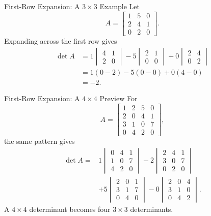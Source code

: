 \begin{frame}{First-Row Expansion: A $3\times3$ Example}
Let
\[
A=\begin{bmatrix}1&5&0\\2&4&1\\0&2&0\end{bmatrix}.
\]
Expanding across the first row gives
\begin{align*}
\det A
&=1\begin{vmatrix}4&1\\2&0\end{vmatrix}
-5\begin{vmatrix}2&1\\0&0\end{vmatrix}
+0\begin{vmatrix}2&4\\0&2\end{vmatrix}\\
&=1(0-2)-5(0-0)+0(4-0)\\
&=-2.
\end{align*}
\end{frame}

\begin{frame}{First-Row Expansion: A $4\times4$ Preview}
\small
For
\[
A=\begin{bmatrix}
1&2&5&0\\
2&0&4&1\\
3&1&0&7\\
0&4&2&0
\end{bmatrix},
\]
the same pattern gives
\[
\begin{aligned}
\det A
={}&1\begin{vmatrix}0&4&1\\1&0&7\\4&2&0\end{vmatrix}
-2\begin{vmatrix}2&4&1\\3&0&7\\0&2&0\end{vmatrix}\\
&+5\begin{vmatrix}2&0&1\\3&1&7\\0&4&0\end{vmatrix}
-0\begin{vmatrix}2&0&4\\3&1&0\\0&4&2\end{vmatrix}.
\end{aligned}
\]
\pause
A $4\times4$ determinant becomes four $3\times3$ determinants.
\end{frame}

